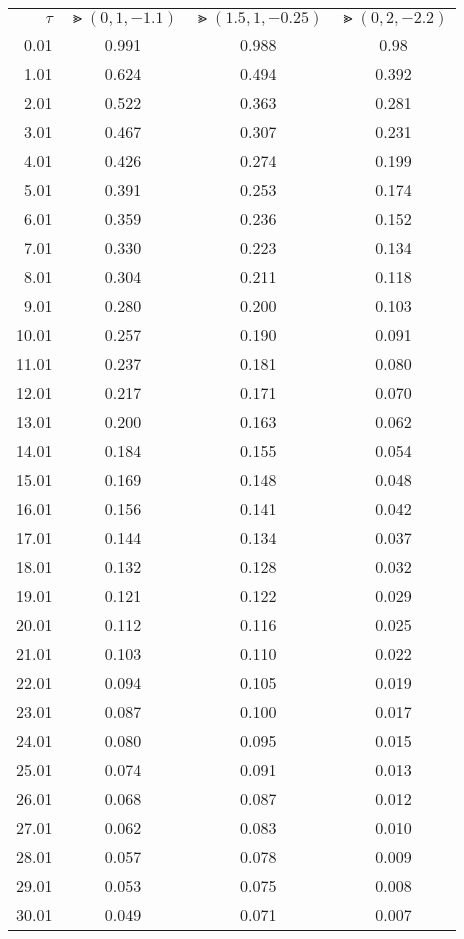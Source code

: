 \begin{table}[H]
	\begin{center}
		\begin{tabular}{r | c | c | c} 
		 	$ \tau $ & $ \Gt(0, 1, -1.1) $ & $ \Gt(1.5, 1, -0.25) $ & $ \Gt(0, 2, -2.2) $ \\ 
		 	\specialrule{.1em}{.05em}{.05em} 
0.01 & 0.991 & 0.988 & 0.98 \\
1.01 & 0.624 & 0.494 & 0.392 \\
2.01 & 0.522 & 0.363 & 0.281 \\
3.01 & 0.467 & 0.307 & 0.231 \\
4.01 & 0.426 & 0.274 & 0.199 \\
5.01 & 0.391 & 0.253 & 0.174 \\
6.01 & 0.359 & 0.236 & 0.152 \\
7.01 & 0.330 & 0.223 & 0.134 \\
8.01 & 0.304 & 0.211 & 0.118 \\
9.01 & 0.280 & 0.200 & 0.103 \\
10.01 & 0.257 & 0.190 & 0.091 \\
11.01 & 0.237 & 0.181 & 0.080 \\
12.01 & 0.217 & 0.171 & 0.070 \\
13.01 & 0.200 & 0.163 & 0.062 \\
14.01 & 0.184 & 0.155 & 0.054 \\
15.01 & 0.169 & 0.148 & 0.048 \\
16.01 & 0.156 & 0.141 & 0.042 \\
17.01 & 0.144 & 0.134 & 0.037 \\
18.01 & 0.132 & 0.128 & 0.032 \\
19.01 & 0.121 & 0.122 & 0.029 \\
20.01 & 0.112 & 0.116 & 0.025 \\
21.01 & 0.103 & 0.110 & 0.022 \\
22.01 & 0.094 & 0.105 & 0.019 \\
23.01 & 0.087 & 0.100 & 0.017 \\
24.01 & 0.080 & 0.095 & 0.015 \\
25.01 & 0.074 & 0.091 & 0.013 \\
26.01 & 0.068 & 0.087 & 0.012 \\
27.01 & 0.062 & 0.083 & 0.010 \\
28.01 & 0.057 & 0.078 & 0.009 \\
29.01 & 0.053 & 0.075 & 0.008 \\
30.01 & 0.049 & 0.071 & 0.007 \\

\end{tabular}
\end{center}
\end{table}
